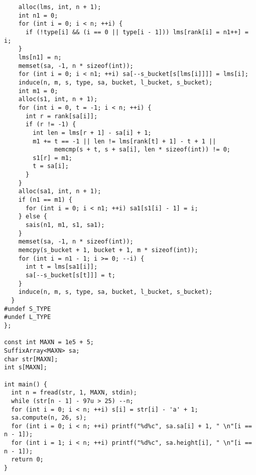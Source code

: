\documentclass[twoside]{article}
\begin{document}
\begin{lstlisting}
    alloc(lms, int, n + 1);
    int n1 = 0;
    for (int i = 0; i < n; ++i) {
      if (!type[i] && (i == 0 || type[i - 1])) lms[rank[i] = n1++] = i;
    }
    lms[n1] = n;
    memset(sa, -1, n * sizeof(int));
    for (int i = 0; i < n1; ++i) sa[--s_bucket[s[lms[i]]]] = lms[i];
    induce(n, m, s, type, sa, bucket, l_bucket, s_bucket);
    int m1 = 0;
    alloc(s1, int, n + 1);
    for (int i = 0, t = -1; i < n; ++i) {
      int r = rank[sa[i]];
      if (r != -1) {
        int len = lms[r + 1] - sa[i] + 1;
        m1 += t == -1 || len != lms[rank[t] + 1] - t + 1 ||
              memcmp(s + t, s + sa[i], len * sizeof(int)) != 0;
        s1[r] = m1;
        t = sa[i];
      }
    }
    alloc(sa1, int, n + 1);
    if (n1 == m1) {
      for (int i = 0; i < n1; ++i) sa1[s1[i] - 1] = i;
    } else {
      sais(n1, m1, s1, sa1);
    }
    memset(sa, -1, n * sizeof(int));
    memcpy(s_bucket + 1, bucket + 1, m * sizeof(int));
    for (int i = n1 - 1; i >= 0; --i) {
      int t = lms[sa1[i]];
      sa[--s_bucket[s[t]]] = t;
    }
    induce(n, m, s, type, sa, bucket, l_bucket, s_bucket);
  }
#undef S_TYPE
#undef L_TYPE
};

const int MAXN = 1e5 + 5;
SuffixArray<MAXN> sa;
char str[MAXN];
int s[MAXN];

int main() {
  int n = fread(str, 1, MAXN, stdin);
  while (str[n - 1] - 97u > 25) --n;
  for (int i = 0; i < n; ++i) s[i] = str[i] - 'a' + 1;
  sa.compute(n, 26, s);
  for (int i = 0; i < n; ++i) printf("%d%c", sa.sa[i] + 1, " \n"[i == n - 1]);
  for (int i = 1; i < n; ++i) printf("%d%c", sa.height[i], " \n"[i == n - 1]);
  return 0;
}

\end{lstlisting}
\end{document}
